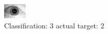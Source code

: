 \begin{figure}[h!]
\begin{center}
\includegraphics[width=0.60\columnwidth]{figures/ID1714_class_3_target_2.png}
\end{center}
\caption{ Classification: 3 actual target: 2}
\label{fig:ID1714_class_3_target_2}
\end{figure}
